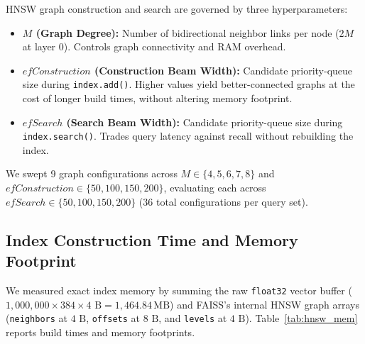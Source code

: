 \documentclass[11pt]{article}
\begin{document}
HNSW graph construction and search are governed by three hyperparameters:
\begin{itemize}
    \item \textbf{$M$ (Graph Degree):} Number of bidirectional neighbor links per node ($2M$ at layer $0$). Controls graph connectivity and RAM overhead.
    \item \textbf{$\mathit{efConstruction}$ (Construction Beam Width):} Candidate priority-queue size during \texttt{index.add()}. Higher values yield better-connected graphs at the cost of longer build times, without altering memory footprint.
    \item \textbf{$\mathit{efSearch}$ (Search Beam Width):} Candidate priority-queue size during \texttt{index.search()}. Trades query latency against recall without rebuilding the index.
\end{itemize}
We swept 9 graph configurations across $M \in \{4, 5, 6, 7, 8\}$ and $\mathit{efConstruction} \in \{50, 100, 150, 200\}$, evaluating each across $\mathit{efSearch} \in \{50, 100, 150, 200\}$ ($36$ total configurations per query set).

\subsection{Index Construction Time and Memory Footprint}
We measured exact index memory by summing the raw \texttt{float32} vector buffer ($1{,}000{,}000 \times 384 \times 4\text{ B} = 1{,}464.84\,\text{MB}$) and FAISS's internal HNSW graph arrays (\texttt{neighbors} at $4\text{ B}$, \texttt{offsets} at $8\text{ B}$, and \texttt{levels} at $4\text{ B}$). Table~\ref{tab:hnsw_mem} reports build times and memory footprints.
\end{document}
